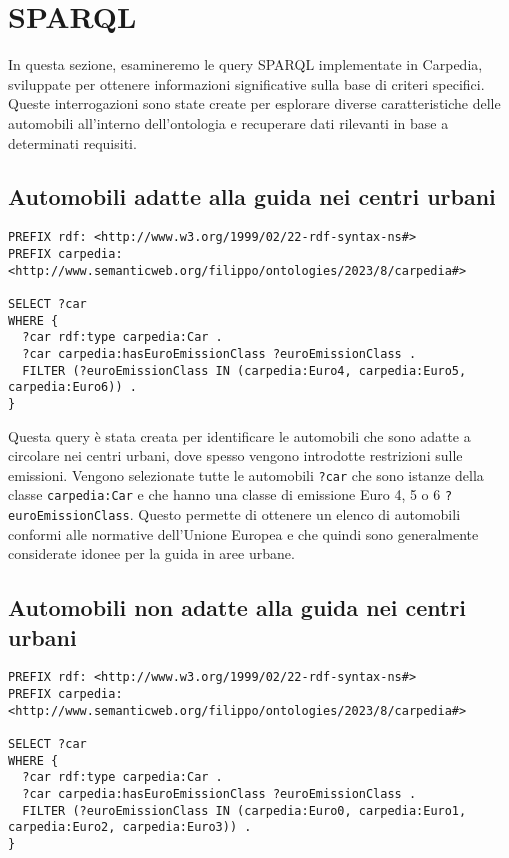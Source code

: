 \section{SPARQL}\label{sec:sparql}

In questa sezione, esamineremo le query SPARQL implementate in Carpedia, sviluppate per ottenere informazioni significative sulla base di criteri specifici.
Queste interrogazioni sono state create per esplorare diverse caratteristiche delle automobili all'interno
dell'ontologia e recuperare dati rilevanti in base a determinati requisiti.

\break

\subsection{Automobili adatte alla guida nei centri urbani}

\begin{lstlisting}[language=SPARQL]
PREFIX rdf: <http://www.w3.org/1999/02/22-rdf-syntax-ns#>
PREFIX carpedia: <http://www.semanticweb.org/filippo/ontologies/2023/8/carpedia#>

SELECT ?car
WHERE {
  ?car rdf:type carpedia:Car .
  ?car carpedia:hasEuroEmissionClass ?euroEmissionClass .
  FILTER (?euroEmissionClass IN (carpedia:Euro4, carpedia:Euro5, carpedia:Euro6)) .
}
\end{lstlisting}

Questa query è stata creata per identificare le automobili che sono adatte a circolare nei centri urbani, dove spesso vengono introdotte restrizioni sulle emissioni.
Vengono selezionate tutte le automobili \texttt{?car} che sono istanze della classe \texttt{carpedia:Car} e che hanno una classe di emissione Euro 4, 5 o 6 \texttt{?euroEmissionClass}.
Questo permette di ottenere un elenco di automobili conformi alle normative dell'Unione Europea e che quindi sono generalmente considerate idonee per la guida in aree urbane.

\subsection{Automobili non adatte alla guida nei centri urbani}

\begin{lstlisting}[language=SPARQL]
PREFIX rdf: <http://www.w3.org/1999/02/22-rdf-syntax-ns#>
PREFIX carpedia: <http://www.semanticweb.org/filippo/ontologies/2023/8/carpedia#>

SELECT ?car
WHERE {
  ?car rdf:type carpedia:Car .
  ?car carpedia:hasEuroEmissionClass ?euroEmissionClass .
  FILTER (?euroEmissionClass IN (carpedia:Euro0, carpedia:Euro1, carpedia:Euro2, carpedia:Euro3)) .
}
\end{lstlisting}


